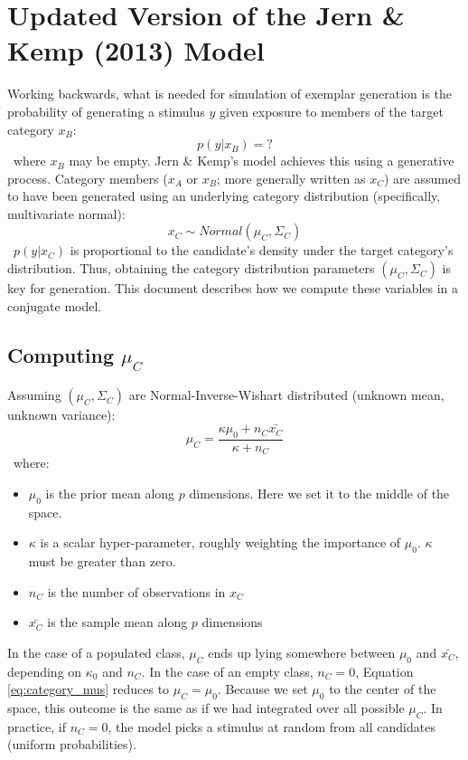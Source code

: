 \documentclass[12pt]{article}
\begin{document}
\VerbatimFootnotes

\section*{Updated Version of the Jern \& Kemp (2013) Model}

Working backwards, what is needed for simulation of exemplar generation is the probability of generating a stimulus $y$ given exposure to members of the target category $x_B$:
\
\begin{equation}
p(y | x_B) = ?
\end{equation}
\
where $x_B$ may be empty. Jern \& Kemp's model achieves this using a generative process. Category members ($x_A$ or $x_B$; more generally written as $x_C$) are assumed to have been generated using an underlying category distribution (specifically, multivariate normal):
\
\begin{equation}
  x_C \sim Normal(\mu_{C}, \Sigma_{C})
\end{equation}
\
$p(y | x_C)$ is proportional to the candidate's density under the target category's distribution. Thus, obtaining the category distribution parameters $(\mu_{C}, \Sigma_{C})$ is key for generation. This document describes how we compute these variables in a conjugate model. 

\subsection*{Computing $\mu_C$}
Assuming $(\mu_C, \Sigma_C)$ are Normal-Inverse-Wishart distributed (unknown mean, unknown variance):
\
\begin{equation}
  \mu_C = \dfrac
    {\kappa\mu_{0} + n_C \bar{x_C}}
    {\kappa + n_C}
    \label{eq:category_mus}
\end{equation}
\ 
where:
\begin{itemize}
    \setlength\itemsep{-0.5em}
    \item $\mu_{0}$ is the prior mean along $p$ dimensions. Here we set it to the middle of the space.
    \item $\kappa$ is a scalar hyper-parameter, roughly weighting the importance of $\mu_{0}$. $\kappa$ must be greater than zero.
    \item $n_C$ is the number of observations in $x_C$
    \item $\bar{x_C}$ is the sample mean along $p$ dimensions
\end{itemize}

In the case of a populated class, $\mu_{C}$ ends up lying somewhere between $\mu_{0}$ and $\bar{x_C}$, depending on $\kappa_{0}$ and $n_C$. In the case of an empty class, $n_C = 0$, Equation \ref{eq:category_mus} reduces to $\mu_{C} = \mu_{0}$. Because we set $\mu_0$ to the center of the space, this outcome is the same as if we had integrated over all possible $\mu_C$. In practice, if $n_C = 0$, the model picks a stimulus at random from all candidates (uniform probabilities). 
\end{document}
